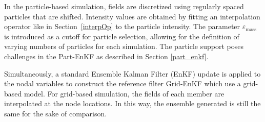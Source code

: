 In the particle-based simulation, fields are discretized using regularly spaced particles that are shifted. Intensity values are obtained by fitting an interpolation operator like in Section~\ref{interpOp} to the particle intensity.
The parameter $\varepsilon_{\text{mass}}$ is introduced as a cutoff for particle selection, allowing for the definition of varying numbers of particles for each simulation. The particle support poses challenges in the Part-EnKF as described in Section \ref{part_enkf}.

Simultaneously, a standard Ensemble Kalman Filter (EnKF) update is applied to the nodal variables to construct the reference filter Grid-EnKF which use a grid-based model. For grid-based simulation, the fields of each member are interpolated at the node locations. In this way, the ensemble generated is still the same for the sake of comparison.


